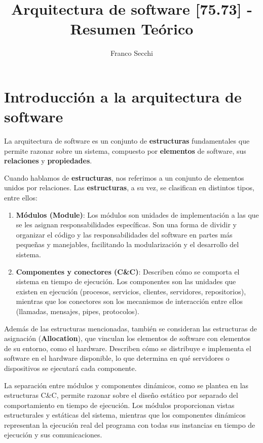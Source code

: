\documentclass{article}
\title{Arquitectura de software [75.73] - Resumen Teórico}
\author{Franco Secchi}
\begin{document}
	\maketitle
	\renewcommand{\contentsname}{Contenidos}
	\renewcommand{\figurename}{Figura}

	\tableofcontents
	\newpage
		\section {Introducción a la arquitectura de software}
			La arquitectura de software es un conjunto de \textbf{estructuras} fundamentales que permite razonar sobre un sistema, compuesto por \textbf{elementos} de software, sus \textbf{relaciones} y \textbf{propiedades}.
			
			Cuando hablamos de \textbf{estructuras}, nos referimos a un conjunto de elementos unidos por relaciones. Las \textbf{estructuras}, a su vez, se clasifican en distintos tipos, entre ellos:
			\begin{enumerate}
				\item \textbf{Módulos (Module)}: Los módulos son unidades de implementación a las que se les asignan responsabilidades específicas. Son una forma de dividir y organizar el código y las responsabilidades del software en partes más pequeñas y manejables, facilitando la modularización y el desarrollo del sistema.
				
				\item \textbf{Componentes y conectores (C\&C)}: Describen cómo se comporta el sistema en tiempo de ejecución. Los componentes son las unidades que existen en ejecución (procesos, servicios, clientes, servidores, repositorios), mientras que los conectores son los mecanismos de interacción entre ellos (llamadas, mensajes, pipes, protocolos).
				
			\end{enumerate}
			
			Además de las estructuras mencionadas, también se consideran las estructuras de asignación (\textbf{Allocation}), que vinculan los elementos de software con elementos de su entorno, como el hardware. Describen cómo se distribuye e implementa el software en el hardware disponible, lo que determina en qué servidores o dispositivos se ejecutará cada componente.
			
			La separación entre módulos y componentes dinámicos, como se plantea en las estructuras C\&C, permite razonar sobre el diseño estático por separado del comportamiento en tiempo de ejecución. Los módulos proporcionan vistas estructurales y estáticas del sistema, mientras que los componentes dinámicos representan la ejecución real del programa con todas sus instancias en tiempo de ejecución y sus comunicaciones.
		
\end{document}
